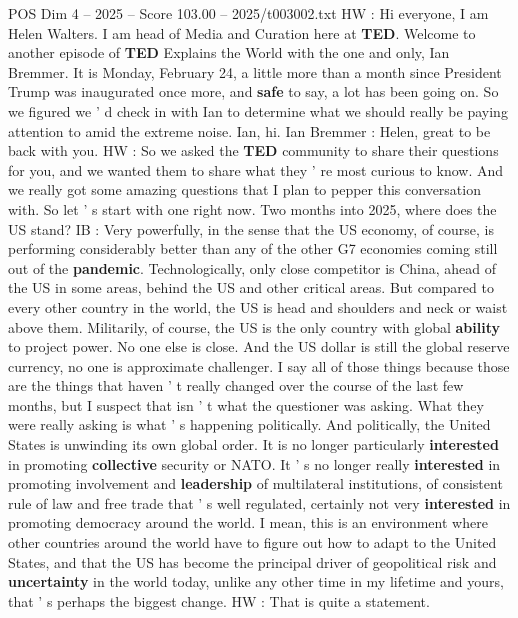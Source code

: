 \begin{textsample}{POS Dim 4 – 2025 – Score 103.00 – 2025/t003002.txt}  \label{ex:f4_pos_001}
HW : Hi everyone, I am Helen Walters.
I am head of Media and Curation here at \textbf{TED}.
Welcome to another episode of \textbf{TED} Explains the World with the one and only, Ian Bremmer.
It is Monday, February 24, a little more than a month since President Trump was inaugurated once more, and \textbf{safe} to say, a lot has been going on.
So we figured we ' d check in with Ian to determine what we should really be paying attention to amid the extreme noise.
Ian, hi.
Ian Bremmer : Helen, great to be back with you.
HW : So we asked the \textbf{TED} community to share their questions for you, and we wanted them to share what they ' re most curious to know.
And we really got some amazing questions that I plan to pepper this conversation with.
So let ' s start with one right now.
Two months into 2025, where does the US stand?
IB : Very powerfully, in the sense that the US economy, of course, is performing considerably better than any of the other G7 economies coming still out of the \textbf{pandemic}.
Technologically, only close competitor is China, ahead of the US in some areas, behind the US and other critical areas.
But compared to every other country in the world, the US is head and shoulders and neck or waist above them.
Militarily, of course, the US is the only country with global \textbf{ability} to project power.
No one else is close.
And the US dollar is still the global reserve currency, no one is approximate challenger.
I say all of those things because those are the things that haven ' t really changed over the course of the last few months, but I suspect that isn ' t what the questioner was asking.
What they were really asking is what ' s happening politically.
And politically, the United States is unwinding its own global order.
It is no longer particularly \textbf{interested} in promoting \textbf{collective} security or NATO.
It ' s no longer really \textbf{interested} in promoting involvement and \textbf{leadership} of multilateral institutions, of consistent rule of law and free trade that ' s well regulated, certainly not very \textbf{interested} in promoting democracy around the world.
I mean, this is an environment where other countries around the world have to figure out how to adapt to the United States, and that the US has become the principal driver of geopolitical risk and \textbf{uncertainty} in the world today, unlike any other time in my lifetime and yours, that ' s perhaps the biggest change.
HW : That is quite a statement.

\end{textsample}
